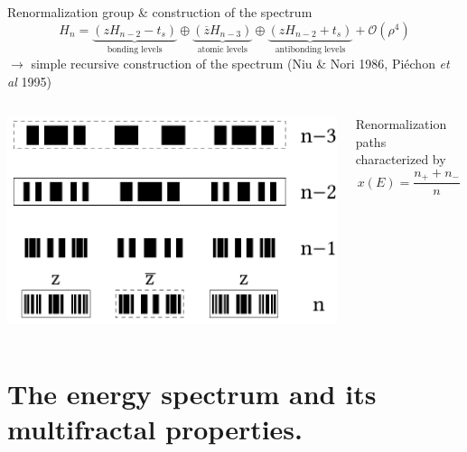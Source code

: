 \documentclass[xcolor=x11names,compress,professionalfonts]{beamer}
\renewcommand{\(}{\begin{columns}}
\renewcommand{\)}{\end{columns}}
\newcommand{\<}[1]{\begin{column}{#1}}
\renewcommand{\>}{\end{column}}
\newcommand{\zb}{\ensuremath{\overline{z}}}
\begin{document}
\begin{frame}{Renormalization group \& construction of the spectrum}
 \[ H_n = \underbrace{\left( z H_{n-2} - t_s \right)}_{\text{bonding levels}} \oplus \underbrace{\left( \zb H_{n-3} \right)}_{\text{atomic levels}} \oplus \underbrace{\left( z H_{n-2} + t_s \right)}_{\text{antibonding levels}} + \mathcal{O}(\rho^4)\]
	$\rightarrow$ simple recursive construction of the spectrum (Niu \& Nori 1986, Piéchon \emph{et al} 1995)
	
	\begin{columns}
	\begin{column}{6cm}
	\centering
	\includegraphics[scale=.45]{recursive_construction_spectrum.pdf}
	\end{column}
	\begin{column}{6cm}
	
	Renormalization paths characterized by
	\[ x(E) = \frac{n_+ + n_-}{n} \]
	\end{column}
	\end{columns}
\end{frame}

\section{The energy spectrum and its multifractal properties.}
\end{document}
